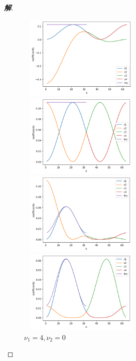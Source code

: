 \documentclass{ctexart}
\newenvironment{sol}{\begin{proof}[\bf 解]}{\end{proof}}
\begin{document}
\begin{sol}
\begin{figure}[htbp]
    \begin{minipage}{6cm}
        \centering
        \includegraphics[width = 6cm, height = 4cm]{41-3.png}
        \caption{$\nu_1=1,\nu_2=1$}
        \label{9.41-fig3}
    \end{minipage}
    \qquad
    \begin{minipage}{6cm}
        \centering
        \includegraphics[width = 6cm, height = 4cm]{41-4.png}
        \caption{$\nu_1=2,\nu_2=0$}
        \label{9.41-fig4}
    \end{minipage}

    \begin{minipage}{6cm}
        \centering
        \includegraphics[width = 6cm, height = 4cm]{41-5.png}
        \caption{$\nu_1=2,\nu_2=2$}
        \label{9.41-fig5}
    \end{minipage}
    \qquad
    \begin{minipage}{6cm}
        \centering
        \includegraphics[width = 6cm, height = 4cm]{41-6.png}
        \caption{$\nu_1=4,\nu_2=0$}
        \label{9.41-fig6}
    \end{minipage}
\end{figure}


\end{sol}
\end{document}
